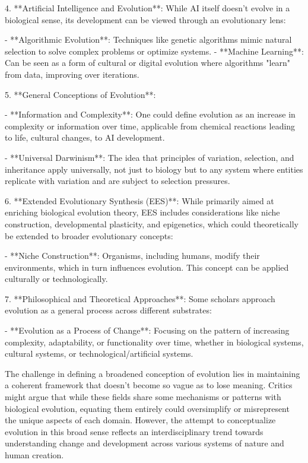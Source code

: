 \documentclass[12pt,titlepage]{book}
\begin{document}
4. **Artificial Intelligence and Evolution**: While AI itself doesn't evolve in a biological sense, its development can be viewed through an evolutionary lens:

   - **Algorithmic Evolution**: Techniques like genetic algorithms mimic natural selection to solve complex problems or optimize systems.
   - **Machine Learning**: Can be seen as a form of cultural or digital evolution where algorithms "learn" from data, improving over iterations.

5. **General Conceptions of Evolution**:

   - **Information and Complexity**: One could define evolution as an increase in complexity or information over time, applicable from chemical reactions leading to life, cultural changes, to AI development.
   
   - **Universal Darwinism**: The idea that principles of variation, selection, and inheritance apply universally, not just to biology but to any system where entities replicate with variation and are subject to selection pressures.

6. **Extended Evolutionary Synthesis (EES)**: While primarily aimed at enriching biological evolution theory, EES includes considerations like niche construction, developmental plasticity, and epigenetics, which could theoretically be extended to broader evolutionary concepts:

   - **Niche Construction**: Organisms, including humans, modify their environments, which in turn influences evolution. This concept can be applied culturally or technologically.

7. **Philosophical and Theoretical Approaches**: Some scholars approach evolution as a general process across different substrates:

   - **Evolution as a Process of Change**: Focusing on the pattern of increasing complexity, adaptability, or functionality over time, whether in biological systems, cultural systems, or technological/artificial systems.

   The challenge in defining a broadened conception of evolution lies in maintaining a coherent framework that doesn't become so vague as to lose meaning. Critics might argue that while these fields share some mechanisms or patterns with biological evolution, equating them entirely could oversimplify or misrepresent the unique aspects of each domain. However, the attempt to conceptualize evolution in this broad sense reflects an interdisciplinary trend towards understanding change and development across various systems of nature and human creation.
\end{document}
